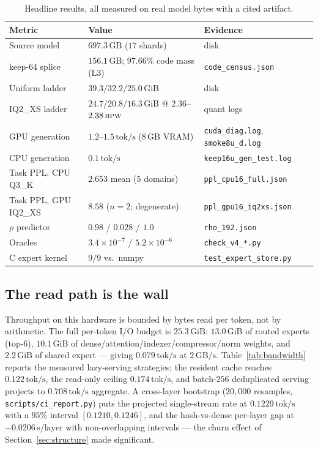 \documentclass[11pt]{article}
\newcommand{\code}[1]{\texttt{#1}}
\newcommand{\bpw}{\,\textsc{bpw}}
\newcommand{\gib}{\,\textrm{GiB}}
\newcommand{\gb}{\,\textrm{GB}}
\newcommand{\tps}{\,\textrm{tok/s}}
\begin{document}
\begin{table}[t]
\centering
\small
\begin{tabular}{lll}
\toprule
\textbf{Metric} & \textbf{Value} & \textbf{Evidence} \\
\midrule
Source model & $697.3\gb{}$ ($17$ shards) & disk \\
keep-$64$ splice & $156.1\gb{}$; $97.66\%$ code mass (L3) & \code{code\_census.json} \\
Uniform ladder & $39.3/32.2/25.0\gib{}$ & disk \\
IQ2\_XS ladder & $24.7/20.8/16.3\gib{}$ @ $2.36$--$2.38\bpw$ & quant logs \\
GPU generation & $\mathbf{1.2}$--$\mathbf{1.5}\tps{}$ ($8\gb{}$ VRAM) & \code{cuda\_diag.log}, \code{smoke8u\_d.log} \\
CPU generation & $0.1\tps{}$ & \code{keep16u\_gen\_test.log} \\
Task PPL, CPU Q3\_K & $2.653$ mean ($5$ domains) & \code{ppl\_cpu16\_full.json} \\
Task PPL, GPU IQ2\_XS & $8.58$ ($n{=}2$; degenerate) & \code{ppl\_gpu16\_iq2xs.json} \\
$\rho$ predictor & $0.98$ / $0.028$ / $1.0$ & \code{rho\_192.json} \\
Oracles & $3.4\times10^{-7}$ / $5.2\times10^{-6}$ & \code{check\_v4\_*.py} \\
C expert kernel & $9/9$ vs.\ numpy & \code{test\_expert\_store.py} \\
\bottomrule
\end{tabular}
\caption{Headline results, all measured on real model bytes with a cited artifact.}
\label{tab:headline}
\end{table}

\subsection{The read path is the wall}

Throughput on this hardware is bounded by bytes read per token, not by
arithmetic. The full per-token I/O budget is $25.3\gib{}$: $13.0\gib{}$ of routed
experts (top-$6$), $10.1\gib{}$ of dense/attention/indexer/compressor/norm
weights, and $2.2\gib{}$ of shared expert --- giving $0.079\tps{}$ at
$2\gb{}/\textrm{s}$. Table~\ref{tab:bandwidth} reports the measured lazy-serving
strategies; the resident cache reaches $0.122\tps{}$, the read-only ceiling
$0.174\tps{}$, and batch-$256$ deduplicated serving projects to $0.708\tps{}$
aggregate. A cross-layer bootstrap ($20{,}000$ resamples,
\code{scripts/ci\_report.py}) puts the projected single-stream rate at
$0.1229\tps{}$ with a $95\%$ interval $[0.1210,0.1246]$, and the hash-vs-dense
per-layer gap at $-0.0206\,\textrm{s/layer}$ with non-overlapping intervals ---
the churn effect of Section~\ref{sec:structure} made significant.
\end{document}
